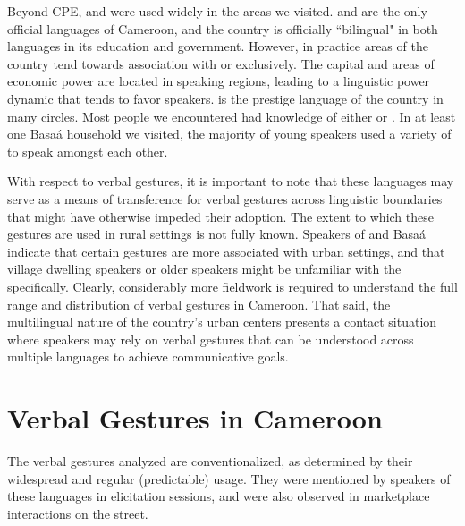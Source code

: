 \documentclass[output=paper
,newtxmath
,modfonts
,nonflat]{langsci/langscibook}
\begin{document}
Beyond CPE,  and  were used widely in the areas we visited.   and  are the only official languages of Cameroon, and the country is officially ``bilingual" in both languages in its education and government. However, in practice areas of the country tend towards association with  or  exclusively. The capital and areas of economic power are located in  speaking regions, leading to a linguistic power dynamic that tends to favor  speakers.  is the prestige language of the country in many circles. Most people we encountered had knowledge of either  or . In at least one Basa\'a household we visited, the majority of young speakers used a variety of  to speak amongst each other. 

With respect to verbal gestures, it is important to note that these languages may serve as a means of transference for verbal gestures across linguistic boundaries that might have otherwise impeded their adoption. The extent to which these gestures are used in rural settings is not fully known. Speakers of  and Basa\'a indicate that certain gestures are more associated with urban settings, and that village dwelling speakers or older speakers might be unfamiliar with the  specifically.  Clearly, considerably more fieldwork is required to understand the full range and distribution of verbal gestures in Cameroon. That said, the multilingual nature of the country's urban centers presents a  contact situation where speakers may rely on verbal gestures that can be understood across multiple languages to achieve communicative goals.


\section{Verbal Gestures in Cameroon}\label{sec:pillion:vg}
The verbal gestures analyzed are conventionalized, as determined by their widespread and regular (predictable) usage. They were mentioned by speakers of these languages in elicitation sessions, and were also observed in marketplace interactions on the street. 

\noindent
\end{document}

